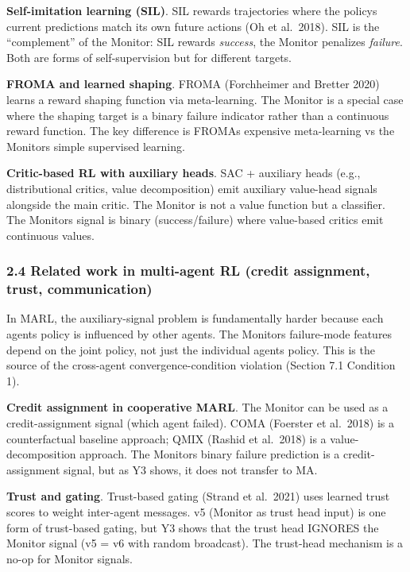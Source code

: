 \documentclass[
]{article}
\begin{document}
\textbf{Self-imitation learning (SIL)}. SIL rewards trajectories where
the policys current predictions match its own future actions (Oh et
al.~2018). SIL is the ``complement'' of the Monitor: SIL rewards
\emph{success}, the Monitor penalizes \emph{failure}. Both are forms of
self-supervision but for different targets.

\textbf{FROMA and learned shaping}. FROMA (Forchheimer and Bretter 2020)
learns a reward shaping function via meta-learning. The Monitor is a
special case where the shaping target is a binary failure indicator
rather than a continuous reward function. The key difference is FROMAs
expensive meta-learning vs the Monitors simple supervised learning.

\textbf{Critic-based RL with auxiliary heads}. SAC + auxiliary heads
(e.g., distributional critics, value decomposition) emit auxiliary
value-head signals alongside the main critic. The Monitor is not a value
function but a classifier. The Monitors signal is binary
(success/failure) where value-based critics emit continuous values.

\subsubsection{2.4 Related work in multi-agent RL (credit assignment,
trust,
communication)}\label{related-work-in-multi-agent-rl-credit-assignment-trust-communication}

In MARL, the auxiliary-signal problem is fundamentally harder because
each agents policy is influenced by other agents. The Monitors
failure-mode features depend on the joint policy, not just the
individual agents policy. This is the source of the cross-agent
convergence-condition violation (Section 7.1 Condition 1).

\textbf{Credit assignment in cooperative MARL}. The Monitor can be used
as a credit-assignment signal (which agent failed). COMA (Foerster et
al.~2018) is a counterfactual baseline approach; QMIX (Rashid et
al.~2018) is a value- decomposition approach. The Monitors binary
failure prediction is a credit-assignment signal, but as Y3 shows, it
does not transfer to MA.

\textbf{Trust and gating}. Trust-based gating (Strand et al.~2021) uses
learned trust scores to weight inter-agent messages. v5 (Monitor as
trust head input) is one form of trust-based gating, but Y3 shows that
the trust head IGNORES the Monitor signal (v5 = v6 with random
broadcast). The trust-head mechanism is a no-op for Monitor signals.
\end{document}
